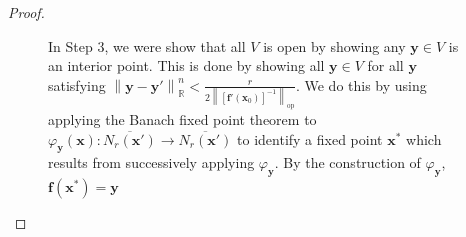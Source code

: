 \documentclass{article}
\newcommand{\R}{\mathbb{R}}
\newcommand{\x}{\mathbf{x}}
\newcommand{\f}{\mathbf{f}}
\newcommand{\y}{\mathbf{y}}
\newcommand{\norm}[1]{\left\lVert#1\right\rVert}
\newcommand{\normop}[1]{\left\lVert#1\right\rVert_\text{op}}
\theoremstyle{definition}
\begin{document}
\begin{proof}
\begin{enumerate}
\begin{figure}[h!]
				\caption{In Step 3, we were show that all $ V $ is open by showing any $ \y\in V $ is an interior point. This is done by showing all $ \y\in V $ for all $ \y $ satisfying $ \norm{\y-\y'}_\R^n <\frac{r}{2\normop{[\f'(\x_0)]^{-1}}}  $. We do this by using applying the Banach fixed point theorem to $ \varphi_\y(\x):\overline{N_r(\x')}\to \overline{N_r(\x')} $ to identify a fixed point $ \x^* $ which results from successively applying $ \varphi_\y $. By the construction of $ \varphi_\y $, $ \f(\x^*)=\y $ }
			\end{figure}
			

\end{enumerate}
\end{proof}
\end{document}
